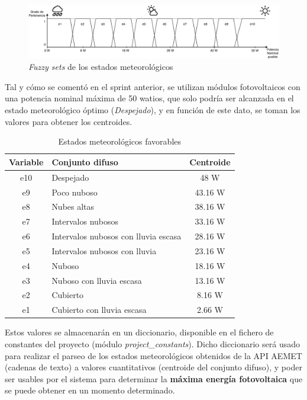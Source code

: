 \begin{figure}[!h]
	\centering
	\includegraphics[width=17cm]{figs/Fuzzy_diagram.pdf}
	\caption{\textit{Fuzzy sets} de los estados meteorológicos}
        \label{fig:fuzzySets}
\end{figure}

Tal y cómo se comentó en el sprint anterior, se utilizan módulos fotovoltaicos con una potencia nominal máxima de 50 watios, que solo podría ser alcanzada en el estado meteorológico óptimo (\textit{Despejado}), y en función de este dato, se toman los valores para obtener los centroides.
\begin{table}[hp]
        \centering
        \begin{tabular}{|c|l|c|}
                \hline
                \textbf{Variable} & \textbf{Conjunto difuso} & \textbf{Centroide} \\ \hline
                e10 & Despejado & 48 W \\ \hline
                e9 & Poco nuboso & 43.16 W \\ \hline
                e8 & Nubes altas & 38.16 W \\ \hline
                e7 & Intervalos nubosos & 33.16 W \\ \hline
                e6 & Intervalos nubosos con lluvia escasa & 28.16 W \\ \hline
                e5 & Intervalos nubosos con lluvia & 23.16 W \\ \hline
                e4 & Nuboso & 18.16 W \\ \hline
                e3 & Nuboso con lluvia escasa & 13.16 W \\ \hline
                e2 & Cubierto & 8.16 W \\ \hline
                e1 & Cubierto con lluvia escasa & 2.66 W\\ \hline
        \end{tabular}
        \caption{Estados meteorológicos favorables}
        \label{tab:estadosFavorables}
\end{table}

Estos valores se almacenarán en un diccionario, disponible en el fichero de constantes del proyecto (módulo \textit{project\_constants}). Dicho diccionario será usado para realizar el parseo de los estados meteorológicos obtenidos de la API AEMET (cadenas de texto) a valores cuantitativos (centroide del conjunto difuso), y poder ser usables por el sistema para determinar la \textbf{máxima energía fotovoltaica} que se puede obtener en un momento determinado.
